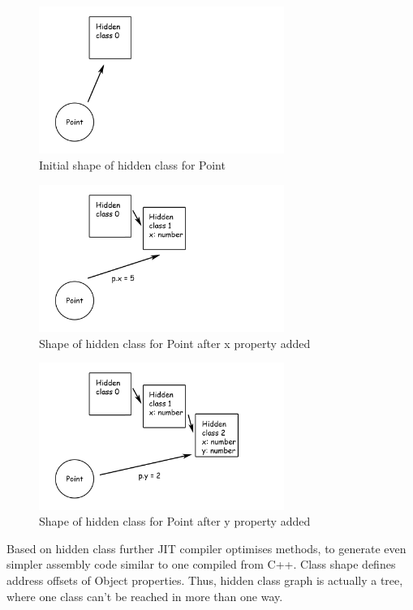 \begin{figure}[h!]
  \caption{Initial shape of hidden class for Point}
  \label{img:point0}
  \centering
	\includegraphics[width=8cm]{point0}
\end{figure}
\begin{figure}[h!]
  \caption{Shape of hidden class for Point after x property added}
  \label{img:point1}
  \centering
	\includegraphics[width=8cm]{point1}
\end{figure}
\begin{figure}[h!]
  \caption{Shape of hidden class for Point after y property added}
  \label{img:point2}
  \centering
	\includegraphics[width=8cm]{point2}
\end{figure}

Based on hidden class further JIT compiler optimises methods, to generate even simpler assembly code similar to one compiled from C++. Class shape defines address offsets of Object properties. Thus, hidden class graph is actually a tree, where one class can't be reached in more than one way.

